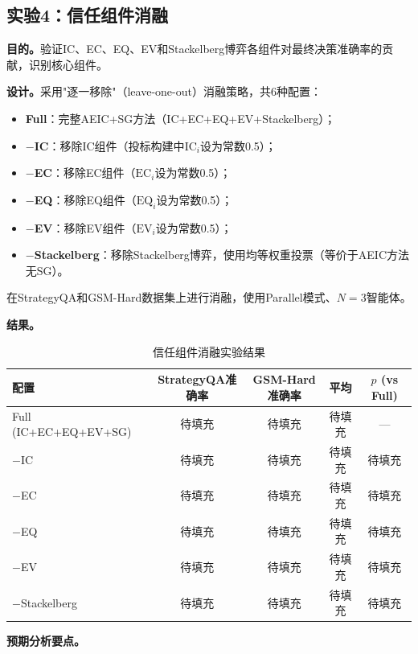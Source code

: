 \documentclass[12pt,a4paper,UTF8,fontset=fandol]{ctexart}
\begin{document}
\subsection{实验4：信任组件消融}\label{sec:exp4}

\textbf{目的。}验证IC、EC、EQ、EV和Stackelberg博弈各组件对最终决策准确率的贡献，识别核心组件。

\textbf{设计。}采用"逐一移除"（leave-one-out）消融策略，共6种配置：

\begin{itemize}[nosep]
    \item \textbf{Full}：完整AEIC+SG方法（IC+EC+EQ+EV+Stackelberg）；
    \item \textbf{$-$IC}：移除IC组件（投标构建中$\text{IC}_i$设为常数0.5）；
    \item \textbf{$-$EC}：移除EC组件（$\text{EC}_i$设为常数0.5）；
    \item \textbf{$-$EQ}：移除EQ组件（$\text{EQ}_i$设为常数0.5）；
    \item \textbf{$-$EV}：移除EV组件（$\text{EV}_i$设为常数0.5）；
    \item \textbf{$-$Stackelberg}：移除Stackelberg博弈，使用均等权重投票（等价于AEIC方法无SG）。
\end{itemize}

在StrategyQA和GSM-Hard数据集上进行消融，使用Parallel模式、$N=3$智能体。

\textbf{结果。}

\begin{table}[H]
\centering
\caption{信任组件消融实验结果}\label{tab:exp4}
\begin{tabular}{lcccc}
\toprule
配置 & StrategyQA准确率 & GSM-Hard准确率 & 平均 & $p$ (vs Full) \\
\midrule
Full (IC+EC+EQ+EV+SG) & 待填充 & 待填充 & 待填充 & — \\
$-$IC & 待填充 & 待填充 & 待填充 & 待填充 \\
$-$EC & 待填充 & 待填充 & 待填充 & 待填充 \\
$-$EQ & 待填充 & 待填充 & 待填充 & 待填充 \\
$-$EV & 待填充 & 待填充 & 待填充 & 待填充 \\
$-$Stackelberg & 待填充 & 待填充 & 待填充 & 待填充 \\
\bottomrule
\end{tabular}
\end{table}

\textbf{预期分析要点。}
\end{document}
